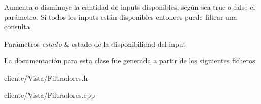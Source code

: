 \-Aumenta o disminuye la cantidad de inputs disponibles, según sea true o false el parámetro. \-Si todos los inputs están disponibles entonces puede filtrar una consulta. 
\begin{DoxyParams}{\-Parámetros}
{\em estado} & estado de la disponibilidad del input \\
\hline
\end{DoxyParams}


\-La documentación para esta clase fue generada a partir de los siguientes ficheros\-:\begin{DoxyCompactItemize}
\item 
cliente/\-Vista/\-Filtradores.\-h\item 
cliente/\-Vista/\-Filtradores.\-cpp\end{DoxyCompactItemize}
